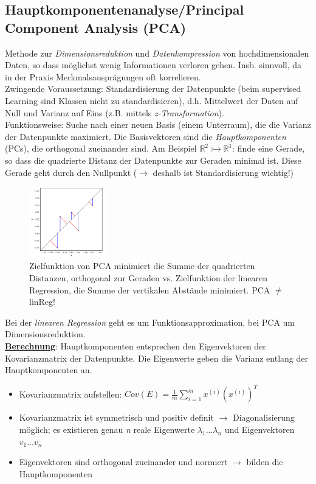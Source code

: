 \subsection{Hauptkomponentenanalyse/Principal Component Analysis (PCA)}
\label{pca}
Methode zur \emph{Dimensionsreduktion} und \emph{Datenkompression} von hochdimensionalen Daten, so dass möglichst wenig Informationen verloren gehen. Insb. sinnvoll, da in der Praxis Merkmalsausprägungen oft korrelieren.\\

Zwingende Voraussetzung: Standardisierung der Datenpunkte (beim supervised Learning sind Klassen nicht zu standardisieren), d.h. Mittelwert der Daten auf Null und Varianz auf Eins (z.B. mittels \emph{z-Transformation}).\\

Funktionsweise: Suche nach einer neuen Basis (einem Unterraum), die die Varianz der Datenpunkte maximiert. Die Basisvektoren sind die \emph{Hauptkomponenten} (PCs), die orthogonal zueinander sind. Am Beispiel $\mathbb{R}^2 \rightarrowtail\mathbb{R}^1$: finde eine Gerade, so dass die quadrierte Distanz der Datenpunkte zur Geraden minimal ist. Diese Gerade geht durch den Nullpunkt ($\rightarrow$ deshalb ist Standardisierung wichtig!)\\

\begin{figure}[H]
\centering
\includegraphics[width=0.3\textwidth]{unsupervisedLearning/PCA_linReg.png}
\caption{Zielfunktion von PCA minimiert die Summe der quadrierten Distanzen, orthogonal zur Geraden vs. Zielfunktion der linearen Regression, die Summe der vertikalen Abstände minimiert. PCA $\neq $ linReg!}
\end{figure}

Bei der \emph{linearen Regression} geht es um Funktionsapproximation, bei PCA um Dimensionsreduktion.\\

\underline{\textbf{Berechnung}}: Hauptkomponenten entsprechen den Eigenvektoren der Kovarianzmatrix der Datenpunkte. Die Eigenwerte geben die Varianz entlang der Hauptkomponenten an.
\begin{itemize}
    \item Kovarianzmatrix aufstellen: $Cov(E)=\frac{1}{m}\sum_{i=1}^{m} x^{(i)}(x^{(i)})^T$
    \item Kovarianzmatrix ist symmetrisch und positiv definit $\rightarrow$ Diagonalisierung möglich; es existieren genau \emph{n} reale Eigenwerte $\lambda_1\dots\lambda_n$ und Eigenvektoren $v_1\dots v_n$
    \item Eigenvektoren sind orthogonal zueinander und normiert $\rightarrow$ bilden die Hauptkomponenten
\end{itemize}

